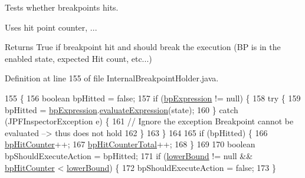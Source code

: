 Tests whether breakpoints hits. 

Uses hit point counter, ...

\begin{DoxyReturn}{Returns}
True if breakpoint hit and should break the execution (BP is in the enabled state, expected Hit count, etc...) 
\end{DoxyReturn}


Definition at line 155 of file Internal\+Breakpoint\+Holder.\+java.


\begin{DoxyCode}
155                                                            \{
156     \textcolor{keywordtype}{boolean} bpHitted = \textcolor{keyword}{false};
157     \textcolor{keywordflow}{if} (\hyperlink{classgov_1_1nasa_1_1jpf_1_1inspector_1_1server_1_1breakpoints_1_1_internal_breakpoint_holder_a67bbb21cd50adbff9c0e2a12ecd7ed66}{bpExpression} != null) \{
158       \textcolor{keywordflow}{try} \{
159         bpHitted = \hyperlink{classgov_1_1nasa_1_1jpf_1_1inspector_1_1server_1_1breakpoints_1_1_internal_breakpoint_holder_a67bbb21cd50adbff9c0e2a12ecd7ed66}{bpExpression}.\hyperlink{interfacegov_1_1nasa_1_1jpf_1_1inspector_1_1server_1_1expression_1_1_expression_boolean_interface_adc81f58d2517d5ccb9ace7f5d8b8211f}{evaluateExpression}(state);
160       \} \textcolor{keywordflow}{catch} (JPFInspectorException e) \{
161         \textcolor{comment}{// Ignore the exception Breakpoint cannot be evaluated --> thus does not hold}
162       \}
163     \}
164 
165     \textcolor{keywordflow}{if} (bpHitted) \{
166       \hyperlink{classgov_1_1nasa_1_1jpf_1_1inspector_1_1server_1_1breakpoints_1_1_internal_breakpoint_holder_aec846067d31df66ea565a3e8bd4e0020}{bpHitCounter}++;
167       \hyperlink{classgov_1_1nasa_1_1jpf_1_1inspector_1_1server_1_1breakpoints_1_1_internal_breakpoint_holder_aa6339c33fa2fa9bb89094609ae7ec656}{bpHitCounterTotal}++;
168     \}
169 
170     \textcolor{keywordtype}{boolean} bpShouldExecuteAction = bpHitted;
171     \textcolor{keywordflow}{if} (\hyperlink{classgov_1_1nasa_1_1jpf_1_1inspector_1_1server_1_1breakpoints_1_1_internal_breakpoint_holder_ae884e78a734be2e3d219243eb2b3aa12}{lowerBound} != null && \hyperlink{classgov_1_1nasa_1_1jpf_1_1inspector_1_1server_1_1breakpoints_1_1_internal_breakpoint_holder_aec846067d31df66ea565a3e8bd4e0020}{bpHitCounter} < \hyperlink{classgov_1_1nasa_1_1jpf_1_1inspector_1_1server_1_1breakpoints_1_1_internal_breakpoint_holder_ae884e78a734be2e3d219243eb2b3aa12}{lowerBound}) \{
172       bpShouldExecuteAction = \textcolor{keyword}{false};
173     \}

\end{DoxyCode}
